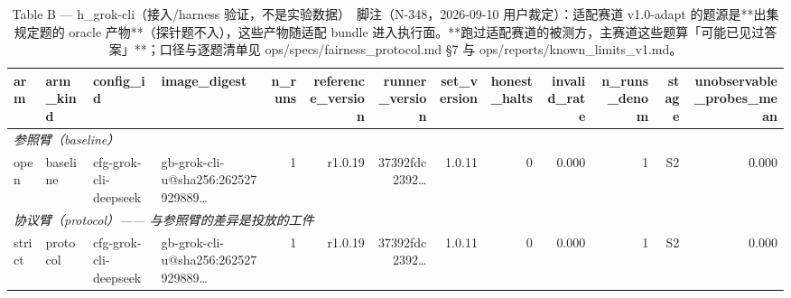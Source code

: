 \begin{table}[t]
\centering
\caption{Table B — h\_grok-cli（接入/harness 验证，不是实验数据）　脚注（N-348，2026-09-10 用户裁定）：适配赛道 v1.0-adapt 的题源是**出集规定题的 oracle 产物**（探针题不入），这些产物随适配 bundle 进入执行面。**跑过适配赛道的被测方，主赛道这些题算「可能已见过答案」**；口径与逐题清单见 ops/specs/fairness\_protocol.md §7 与 ops/reports/known\_limits\_v1.md。}
\label{tab:b-h_grok-cli}
\begin{tabular}{llllrrrrrrrrr}
\toprule
arm & arm\_kind & config\_id & image\_digest & n\_runs & reference\_version & runner\_version & set\_version & honest\_halts & invalid\_rate & n\_runs\_denom & stage & unobservable\_probes\_mean \\
\midrule
\multicolumn{13}{l}{\textit{参照臂（baseline）}} \\
open & baseline & cfg-grok-cli-deepseek & gb-grok-cli-u@sha256:262527929889… & 1 & r1.0.19 & 37392fdc2392… & 1.0.11 & 0 & 0.000 & 1 & S2 & 0.000 \\
\midrule
\multicolumn{13}{l}{\textit{协议臂（protocol）—— 与参照臂的差异是投放的工件}} \\
strict & protocol & cfg-grok-cli-deepseek & gb-grok-cli-u@sha256:262527929889… & 1 & r1.0.19 & 37392fdc2392… & 1.0.11 & 0 & 0.000 & 1 & S2 & 0.000 \\
\bottomrule
\end{tabular}
\end{table}

